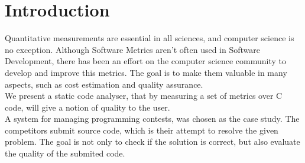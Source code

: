 \section{Introduction}
Quantitative measurements are essential in all sciences, and computer science is no exception.
Although Software Metrics aren't often used in Software Development, there has been an effort on the computer science community to develop and improve this metrics.
The goal is to make them valuable in many aspects, such as cost estimation and quality assurance.\\
We present a static code analyser, that by measuring a set of metrics over C code, will give a notion of quality to the user.\\
A system for managing programming contests, was chosen as the case study.
The competitors submit source code, which is their attempt to resolve the given problem.
The goal is not only to check if the solution is correct, but also evaluate the quality of the submited code.

